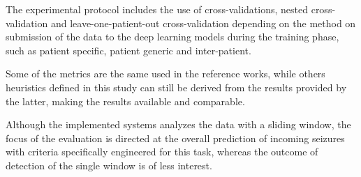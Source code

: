 The experimental protocol includes the use of cross-validations, nested cross-validation and leave-one-patient-out cross-validation depending on the method on submission of the data to the deep learning models during the training phase, such as patient specific, patient generic and inter-patient.

Some of the metrics are the same used in the reference works, while others heuristics defined in this study can still be derived from the results provided by the latter, making the results available and comparable.

Although the implemented systems analyzes the data with a sliding window, the focus of the evaluation is directed at the overall prediction of incoming seizures with criteria specifically engineered for this task, whereas the outcome of detection of the single window is of less interest.
